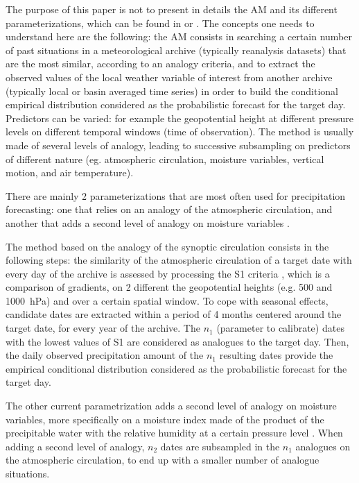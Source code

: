 \documentclass{ametsoc}
\begin{document}
The purpose of this paper is not to present in details the AM and its different parameterizations, which can be found in \citet{Horton2016} or \citet{BenDaoud2015}. The concepts one needs to understand here are the following: the AM consists in searching a certain number of past situations in a meteorological archive (typically reanalysis datasets) that are the most similar, according to an analogy criteria, and to extract the observed values of the local weather variable of interest from another archive (typically local or basin averaged time series) in order to build the conditional empirical distribution considered as the probabilistic forecast for the target day. Predictors can be varied: for example the geopotential height at different pressure levels on different temporal windows (time of observation). The method is usually made of several levels of analogy, leading to successive subsampling on predictors of different nature (eg. atmospheric circulation, moisture variables, vertical motion, and air temperature).

There are mainly 2 parameterizations that are most often used for precipitation forecasting: one that relies on an analogy of the atmospheric circulation, and another that adds a second level of analogy on moisture variables \citep{Obled2002, Bontron2005, Marty2012}.

The method based on the analogy of the synoptic circulation consists in the following steps: the similarity of the atmospheric circulation of a target date with every day of the archive is assessed by processing the S1 criteria \citep{Teweles1954, Drosdowsky2003}, which is a comparison of gradients, on 2 different the geopotential heights (e.g. 500 and 1000~hPa) and over a certain spatial window. To cope with seasonal effects, candidate dates are extracted within a period of 4 months centered around the target date, for every year of the archive. The $n_{1}$ (parameter to calibrate) dates with the lowest values of S1 are considered as analogues to the target day. Then, the daily observed precipitation amount of the $n_{1}$ resulting dates provide the empirical conditional distribution considered as the probabilistic forecast for the target day.

The other current parametrization adds a second level of analogy on moisture variables, more specifically on a moisture index made of the product of the precipitable water with the relative humidity at a certain pressure level \citep[e.g. 850~hPa, see][]{Bontron2004}. When adding a second level of analogy, $n_{2}$ dates are subsampled in the $n_{1}$ analogues on the atmospheric circulation, to end up with a smaller number of analogue situations.
\end{document}
